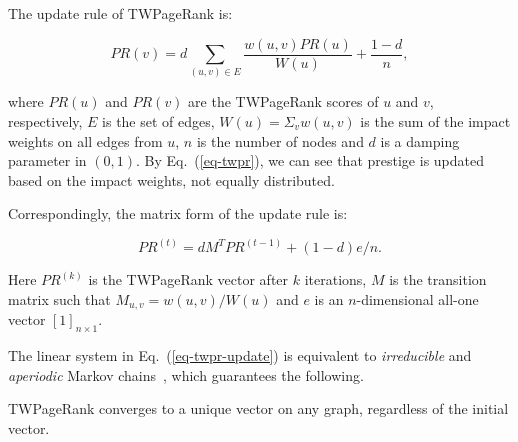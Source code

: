 The update rule of TWPageRank is:

\vspace{-1ex}
\begin{small}
\begin{equation}\label{eq-twpr}
PR(v)=d\sum_{(u,v)\in E} \frac{w(u,v)PR(u)}{W(u)}+\frac{1-d}{n},
\end{equation}
\end{small}
%
\noindent where $PR(u)$ and $PR(v)$ are the TWPageRank scores of $u$ and $v$, respectively, $E$ is the set of edges, $W(u)=\Sigma_{v} w(u,v)$ is the sum of the impact weights on all edges from $u$, $n$ is the number of nodes and $d$ is a damping parameter in $(0, 1)$. By Eq.~(\ref{eq-twpr}), we can see that prestige is updated based on the impact weights, not equally distributed.

Correspondingly, the matrix form of the update rule is:

\vspace{-1ex}
\begin{small}
\begin{equation}
\label{eq-twpr-update}
PR^{(t)}=d M^T  PR^{(t-1)} + (1-d) e/n.
\end{equation}
\end{small}
%
\noindent
Here $PR^{(k)}$ is the TWPageRank vector after $k$ iterations,  $M$ is the transition matrix such that $M_{u,v}=w(u,v)/W(u)$ and  $e$ is an $n$-dimensional all-one vector $[1]_{n\times1}$.

The linear system in Eq.~(\ref{eq-twpr-update}) is equivalent to {\em irreducible} and {\em aperiodic} Markov chains~\cite{CorsoGR05}, which guarantees the following.


\begin{prop}
\label{prop-converg}
TWPageRank converges to a unique  vector on any graph, regardless of the initial vector.
\end{prop}



